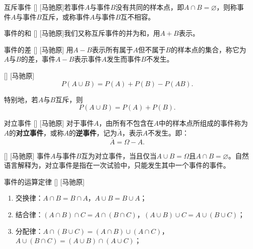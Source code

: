\documentclass[UTF8]{ctexart}
\begin{document}
        \begin{dfn}
            []
            {互斥事件}
            []
            [马驰原]若事件$A$与事件$B$没有共同的样本点，即$A\cap B=\varnothing$，则称事件$A$与事件$B$互斥，或称事件$A$与事件$B$互不相容。
        \end{dfn}

        \begin{dfn}
            []
            {事件的和}
            []
            [马驰原]我们又称互斥事件的并为和，用$A+B$表示。
        \end{dfn}

        \begin{dfn}
            []
            {事件的差}
            []
            [马驰原]
            用$A-B$表示所有属于$A$但不属于$B$的样本点的集合，称它为$A$与$B$的差，事件$A-B$表示事件$A$发生而事件$B$不发生。
        \end{dfn}

        \begin{ppt}
            []
            {}
            []
            [马驰原]
            \[P(A\cup B)=P(A)+P(B)-P(AB).\]
            
            特别地，若$A$与$B$互斥，则
            \[P(A\cup B)=P(A)+P(B).\]
        \end{ppt}

        \begin{dfn}
            []
            {对立事件}
            []
            [马驰原]
            对于事件$A$，由所有不包含在$A$中的样本点所组成的事件称为$A$的\textbf{对立事件}，或称$A$的\textbf{逆事件}，记为$\bar{A}$，表示$A$不发生。即：\[\bar{A}=\Omega-A.\]
        \end{dfn}

        \begin{ppt}
            []
            {}
            []
            [马驰原]
            事件$A$与事件$B$互为对立事件，当且仅当$A\cup B=\Omega$且$A\cap B=\varnothing$。自然语言解释为，对立事件是指在一次试验中，只能发生其中一个事件的事件。
        \end{ppt}

        \begin{ppt}
            []
            {事件的运算定律}
            []
            [马驰原]
            \begin{enumerate}
                \item 交换律：$A\cap B=B\cap A$，$A\cup B=B\cup A$；
                \item 结合律：$(A\cap B)\cap C=A\cap(B\cap C)$，$(A\cup B)\cup C=A\cup(B\cup C)$；
                \item 分配律：$A\cap(B\cup C)=(A\cap B)\cup(A\cap C)$，$A\cup(B\cap C)=(A\cup B)\cap(A\cup C)$；
            \end{enumerate}
        \end{ppt}
\end{document}
